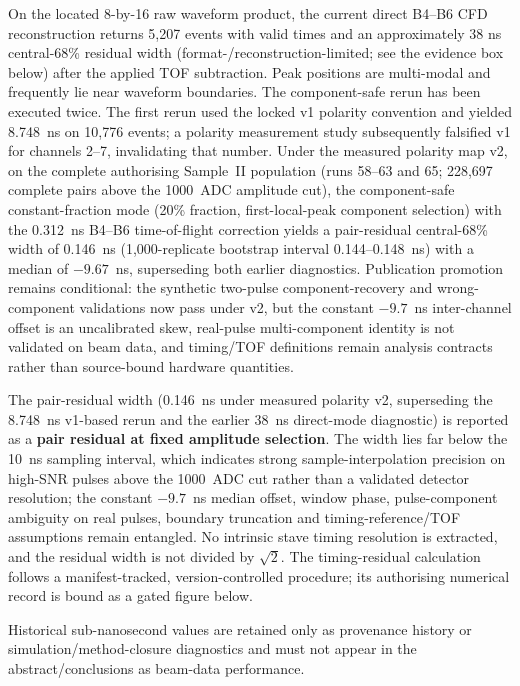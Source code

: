 On the located 8-by-16 raw waveform product, the current direct B4--B6 CFD reconstruction returns 5,207 events with valid times and an approximately 38 ns central-68\% residual width (format-/reconstruction-limited; see the evidence box below) after the applied TOF subtraction. Peak positions are multi-modal and frequently lie near waveform boundaries. The component-safe rerun has been executed twice. The first rerun used the locked v1 polarity convention and yielded 8.748~ns on 10{,}776 events; a polarity measurement study subsequently falsified v1 for channels 2--7, invalidating that number. Under the measured polarity map v2, on the complete authorising Sample~II population (runs 58--63 and 65; 228{,}697 complete pairs above the 1000~ADC amplitude cut), the component-safe constant-fraction mode (20\% fraction, first-local-peak component selection) with the 0.312~ns B4--B6 time-of-flight correction yields a pair-residual central-68\% width of 0.146~ns (1{,}000-replicate bootstrap interval 0.144--0.148~ns) with a median of $-9.67$~ns, superseding both earlier diagnostics. Publication promotion remains conditional: the synthetic two-pulse component-recovery and wrong-component validations now pass under v2, but the constant $-9.7$~ns inter-channel offset is an uncalibrated skew, real-pulse multi-component identity is not validated on beam data, and timing/TOF definitions remain analysis contracts rather than source-bound hardware quantities.

\begin{evidencebox}
The pair-residual width (0.146~ns under measured polarity v2, superseding the 8.748~ns v1-based rerun and the earlier 38~ns direct-mode diagnostic) is reported as a \textbf{pair residual at fixed amplitude selection}. The width lies far below the 10~ns sampling interval, which indicates strong sample-interpolation precision on high-SNR pulses above the 1000~ADC cut rather than a validated detector resolution; the constant $-9.7$~ns median offset, window phase, pulse-component ambiguity on real pulses, boundary truncation and timing-reference/TOF assumptions remain entangled. No intrinsic stave timing resolution is extracted, and the residual width is not divided by $\sqrt{2}$. The timing-residual calculation follows a manifest-tracked, version-controlled procedure; its authorising numerical record is bound as a gated figure below.
\end{evidencebox}


Historical sub-nanosecond values are retained only as provenance history or simulation/method-closure diagnostics and must not appear in the abstract/conclusions as beam-data performance.

